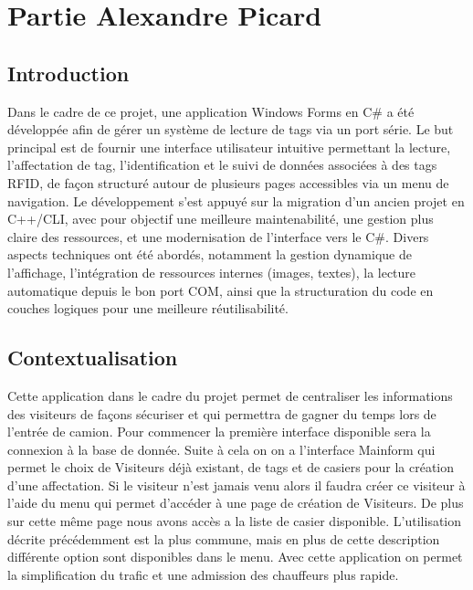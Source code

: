 \documentclass[main.tex]{subfiles}
\begin{document}

\section{Partie Alexandre Picard}

\subsection{Introduction}

\quad Dans le cadre de ce projet, une application Windows Forms en C\# a été développée afin de gérer un système de lecture de tags via un port série. Le but principal est de fournir une interface utilisateur intuitive permettant la lecture, l'affectation de tag, l’identification et le suivi de données associées à des tags RFID, de façon structuré autour de plusieurs pages accessibles via un menu de navigation. Le développement s’est appuyé sur la migration d’un ancien projet en C++/CLI, avec pour objectif une meilleure maintenabilité, une gestion plus claire des ressources, et une modernisation de l’interface vers le C\#. Divers aspects techniques ont été abordés, notamment la gestion dynamique de l'affichage, l'intégration de ressources internes (images, textes), la lecture automatique depuis le bon port COM, ainsi que la structuration du code en couches logiques pour une meilleure réutilisabilité.

\subsection{Contextualisation}

Cette application dans le cadre du projet permet de centraliser les informations des visiteurs de façons sécuriser et qui permettra de gagner du temps lors de l'entrée de camion. Pour commencer la première interface disponible sera la connexion à la base de donnée. Suite à cela on on a l'interface Mainform qui permet le choix de Visiteurs déjà existant, de tags et de casiers pour la création d'une affectation. Si le visiteur n'est jamais venu alors il faudra créer ce visiteur à l'aide du menu qui permet d'accéder à une page de création de Visiteurs. De plus sur cette même page nous avons accès a la liste de casier disponible. L'utilisation décrite précédemment est la plus commune, mais en plus de cette description différente option sont disponibles dans le menu. Avec cette application on permet la simplification du trafic et une admission des chauffeurs plus rapide.
\end{document}
